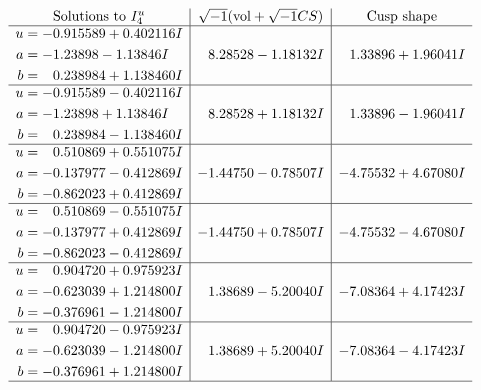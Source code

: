 \documentclass[1p]{elsarticle_modified}
\theoremstyle{definition}
\newcommand{\I}{\sqrt{-1}}
\begin{document}
$$\begin{array}{c|c|c}  
\text{Solutions to }I^u_{4}& \I (\text{vol} + \sqrt{-1}CS) & \text{Cusp shape}\\
 \hline 
\begin{aligned}
u &= -0.915589 + 0.402116 I \\
a &= -1.23898 - 1.13846 I \\
b &= \phantom{-}0.238984 + 1.138460 I\end{aligned}
 & \phantom{-}8.28528 - 1.18132 I & \phantom{-}1.33896 + 1.96041 I \\ \hline\begin{aligned}
u &= -0.915589 - 0.402116 I \\
a &= -1.23898 + 1.13846 I \\
b &= \phantom{-}0.238984 - 1.138460 I\end{aligned}
 & \phantom{-}8.28528 + 1.18132 I & \phantom{-}1.33896 - 1.96041 I \\ \hline\begin{aligned}
u &= \phantom{-}0.510869 + 0.551075 I \\
a &= -0.137977 - 0.412869 I \\
b &= -0.862023 + 0.412869 I\end{aligned}
 & -1.44750 - 0.78507 I & -4.75532 + 4.67080 I \\ \hline\begin{aligned}
u &= \phantom{-}0.510869 - 0.551075 I \\
a &= -0.137977 + 0.412869 I \\
b &= -0.862023 - 0.412869 I\end{aligned}
 & -1.44750 + 0.78507 I & -4.75532 - 4.67080 I \\ \hline\begin{aligned}
u &= \phantom{-}0.904720 + 0.975923 I \\
a &= -0.623039 + 1.214800 I \\
b &= -0.376961 - 1.214800 I\end{aligned}
 & \phantom{-}1.38689 - 5.20040 I & -7.08364 + 4.17423 I \\ \hline\begin{aligned}
u &= \phantom{-}0.904720 - 0.975923 I \\
a &= -0.623039 - 1.214800 I \\
b &= -0.376961 + 1.214800 I\end{aligned}
 & \phantom{-}1.38689 + 5.20040 I & -7.08364 - 4.17423 I\\
 \hline 
 \end{array}$$\newpage\newpage\renewcommand{\arraystretch}{1}
\end{document}
